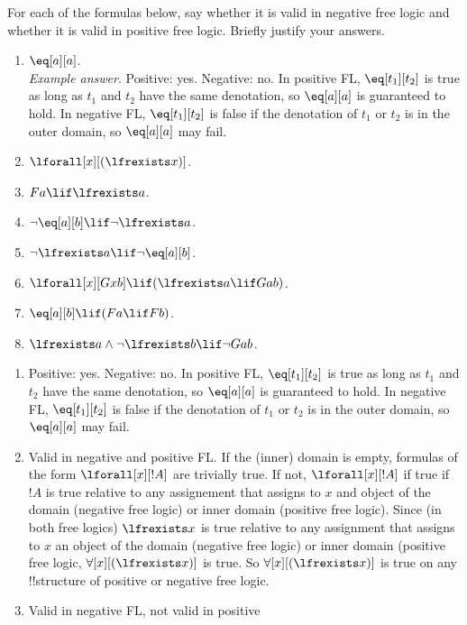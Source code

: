 \documentclass[../../../../include/open-logic-section]{subfiles}
\begin{document}
\begin{prob}
For each of the formulas below, say whether it is valid in negative
free logic and whether it is valid in positive free logic. Briefly justify your answers.
\begin{enumerate}
\item $\eq[a][a]$.\\
\emph{Example answer}. Positive: yes. Negative: no. In positive FL,
$\eq[t_{1}][t_{2}]$ is true as long as $t_{1}$ and $t_{2}$ have the same
denotation, so $\eq[a][a]$ is guaranteed to hold. In negative FL, $\eq[t_{1}][t_{2}]$
is false if the denotation of $t_{1}$ or $t_{2}$ is in the outer
domain, so $\eq[a][a]$ may fail. 
\item $\lforall[x][(\lfrexists x)]$. 
\item $Fa\lif \lfrexists a$.
\item $\lnot \eq[a][b]\lif\lnot \lfrexists a$.
\item $\lnot \lfrexists a\lif\lnot \eq[a][b]$.
\item $\lforall[x][Gxb]\lif(\lfrexists a\lif Gab)$.
\item $\eq[a][b]\lif(Fa\lif Fb)$.
\item $\lfrexists a\land\lnot \lfrexists b\lif\lnot Gab$.
\end{enumerate}
\begin{ans}
\begin{enumerate}
\item Positive: yes. Negative: no. In positive FL, $\eq[t_{1}][t_{2}]$
	is true as long as $t_{1}$ and $t_{2}$ have the same denotation, so
	$\eq[a][a]$ is guaranteed to hold. In negative FL, $\eq[t_{1}][t_{2}]$
	is false if the denotation of $t_{1}$ or $t_{2}$ is in the outer domain,
	so $\eq[a][a]$ may fail. 
\item Valid in negative and positive FL. If the
	(inner) domain is empty, formulas of the form $\lforall[x][!A]$ are
	trivially true. If not, $\lforall[x][!A]$ if true if $!A$ is true
	relative to any assignement that assigns to $x$ and object of the domain
	(negative free logic) or inner domain (positive free logic). Since (in
	both free logics) $\lfrexists x$ is true relative to any assignment that
	assigns to $x$ an object of the domain (negative free logic) or inner
	domain (positive free logic, $\forall[x][(\lfrexists x)]$ is true. So
	$\forall[x][(\lfrexists x)]$ is true on any !!{structure} of positive or
	negative free logic. 
\item Valid in negative FL, not valid in positive

\end{enumerate}
\end{ans}
\end{prob}
\end{document}
